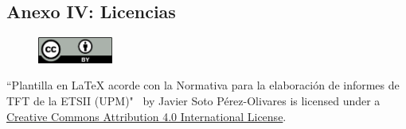 \documentclass[a4paper, 12pt, spanish, twoside]{article}
\begin{document}
\printglossary[title=Glosario, toctitle=Glosario]

\printglossary[type=\acronymtype, title=Acrónimos, toctitle=Acrónimos]


\clearpage




\newpage
\subsection{Anexo IV: Licencias} \label{sec:anexo4}

\begin{figure}
    \vspace{-\baselineskip}
    \href{http://creativecommons.org/licenses/by/4.0/}{\includegraphics[width=0.22\textwidth]{cc-by.png}}
\end{figure} 

\vspace*{\fill}
``Plantilla en LaTeX acorde con la Normativa para la elaboración de informes de TFT de la ETSII (UPM)" \ by Javier Soto Pérez-Olivares is licensed under a \href{http://creativecommons.org/licenses/by/4.0/}{Creative Commons Attribution 4.0 International License}.

\clearpage



\end{document}
